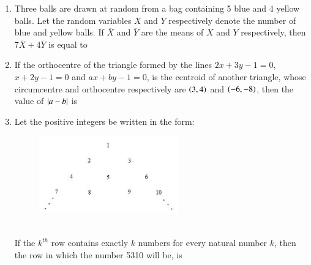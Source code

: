 \documentclass[journal]{IEEEtran}
\begin{document}
\begin{enumerate}
\item Three balls are drawn at random from a bag containing 5 blue and 4 yellow balls. Let the random variables $X$ and $Y$ respectively denote the number of blue and yellow balls. If $\overline{X}$ and $\overline{Y}$ are the means of $X$ and $Y$ respectively, then $7\overline{X} + 4\overline{Y}$ is equal to

\item If the orthocentre of the triangle formed by the lines $2x+3y-1 = 0$, $x+2y-1 = 0$ and $ax + by - 1=0$, is the centroid of another triangle, whose circumcentre and orthocentre respectively are $\left(3,4\right)$ and $\left(-6,-8\right)$, then the value of $\left\vert a-b\right\vert$ is

\item Let the positive integers be written in the form:
\begin{figure}[htp]
    \centering
    \includegraphics[width=6cm]{figs/figure.png}
    \label{fig:figure}
\end{figure}\\
If the $k^{th}$ row contains exactly $k$ numbers for every natural number $k$, then the row in which the number 5310 will be, is

\end{enumerate}
\end{document}
